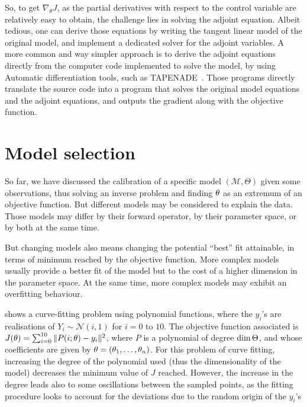 \documentclass[../../Main_ManuscritThese.tex]{subfiles}
\begin{document}
So, to get $\nabla_\theta J$, as the partial derivatives with respect to the control variable are relatively easy to obtain, the challenge lies in solving the adjoint equation. Albeit tedious, one can derive those equations by writing the tangent linear model of the original model, and implement a dedicated solver for the adjoint variables. A more common and way simpler approach is to derive the adjoint equations directly from the computer code implemented to solve the model, by using Automatic differentiation tools, such as \textsc{TAPENADE}~\cite{hascoet_tapenade_2013}. Those programs directly translate the source code into a program that solves the original model equations and the adjoint equations, and outputs the gradient along with the objective function.


\section{Model selection}
\label{sec:model_selection}
So far, we have discussed the calibration of a specific model $(\mathcal{M}, \Theta)$ given some observations, thus solving an inverse problem and finding ${\theta}_{\mathrm{}}$ as an extremum of an objective function. But different models may be considered to explain the data. Those models may differ by their forward operator, by their parameter space, or by both at the same time.

But changing models also means changing the potential ``best'' fit attainable, in terms of minimum reached by the objective function.
More complex models usually provide a better fit of the model but to the cost of a higher dimension in the parameter space. At the same time, more complex models may exhibit an overfitting behaviour.

\begin{example}
 shows a curve-fitting problem using polynomial functions, where the $y_i$'s are realisations of $Y_i \sim \mathcal{N}(i, 1)$ for $i=0$ to $10$. The objective function associated is $J(\theta) = \sum_{i=0}^{10}\|P(i;\theta) - y_i\|^2$, where $P$ is a polynomial of degree $\dim \Theta$, and whose coefficients are given by $\theta = (\theta_1,\dots,\theta_n)$.
For this problem of curve fitting, increasing the degree of the polynomial used (thus the dimensionality of the model) decreases the minimum value of $J$ reached. However, the increase in the degree leads also to some oscillations between the sampled points, as the fitting procedure looks to account for the deviations due to the random origin of the $y_i$'s
\end{example}
\end{document}
